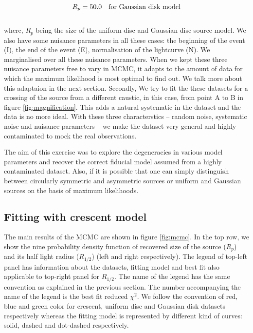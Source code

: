 \begin{equation}
	R_p = 50.0 \ \ \ \rm{for\ Gaussian\ disk\ model}
\end{equation}
\\
where, $R_p$ being the size of the uniform disc and Gaussian disc source model. We also have some nuisance parameters in all these cases: the beginning of the event (I), the end of the event (E), normalisation of the lightcurve (N). We marginalised over all these nuisance parameters. When we kept these three nuisance parameters free to vary in MCMC, it adapts to the amount of data for which the maximum likelihood is most optimal to find out. We talk more about this adaptaion in the next section. Secondly, We try to fit the these datasets for a crossing of the source from a different caustic, in this case, from point A to B in figure \ref{fig:magnification}. This adds a natural systematic in the dataset and the data is no more ideal. With these three characterstics -- random noise, systematic noise and nuisance parameters -- we make the dataset very general and highly contaminated to mock the real observations.

The aim of this exercise was to explore the degeneracies in  various model parameters and recover the correct fiducial model assumed from a highly contaminated dataset. Also, if it is possible that one can simply distinguish between circularly symmetric and asymmetric sources or uniform and Gaussian sources on the basis of maximum likelihoods. 

\subsection{Fitting with crescent model}

The main results of the MCMC are shown in figure \ref{fig:mcmc}. In the top row, we show the nine probability density function of recovered size of the source ($R_p$) and its half light radius ($R_{1/2}$) (left and right respectively). The legend of top-left panel has information about the datasets, fitting model and best fit also applicable to top-right panel for $R_{1/2}$. The name of the legend has the same convention as explained in the previous section. The number accompanying the name of the legend is the best fit reduced $\chi^2$. We follow the convention of red, blue and green color for crescent, uniform disc and Gaussian disk datasets respectively whereas the fitting model is represented by different kind of curves: solid, dashed and dot-dashed respectively.



